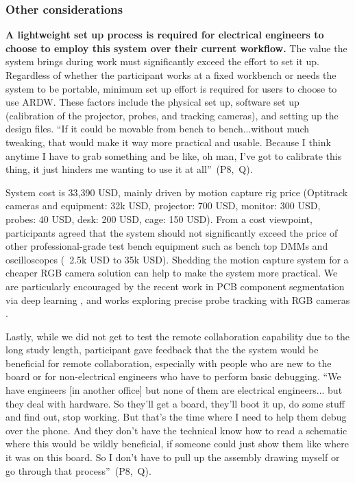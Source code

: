 \documentclass [11pt, proquest] {uwthesis}[2020/02/24]
\newcommand{\ARDWname}{ARDW}
\newcounter{sharc}
\newcommand{\sharcHere}[1]{Q\refstepcounter{sharc}\arabic{sharc}\label{#1}}
\begin{document}
\subsubsection{Other considerations}

\textbf{A lightweight set up process is required for electrical engineers to choose to employ this system over their current workflow.} The value the system brings during work must significantly exceed the effort to set it up. Regardless of whether the participant works at a fixed workbench or needs the system to be portable, minimum set up effort is required for users to choose to use \ARDWname. These factors include the physical set up, software set up (calibration of the projector, probes, and tracking cameras), and setting up the design files. ``If it could be movable from bench to bench...without much tweaking, that would make it way more practical and usable. Because I think anytime I have to grab something and be like, oh man, I've got to calibrate this thing, it just hinders me wanting to use it at all''~(P8,~\sharcHere{q:portable}).

{System cost is 33,390 USD, mainly driven by motion capture rig price (Optitrack cameras and equipment: 32k USD, projector: 700 USD, monitor: 300 USD, probes: 40 USD, desk: 200 USD, cage: 150 USD).}
From a cost viewpoint, participants agreed that the system should not significantly exceed the price of other professional-grade test bench equipment such as bench top DMMs and oscilloscopes (~2.5k USD to 35k USD).
Shedding the motion capture system for a cheaper RGB camera solution can help to make the system more practical. We are particularly encouraged by the recent work in PCB component segmentation via deep learning \cite{Pasunuri2022ASegmentation}, and works exploring precise probe tracking with RGB cameras \cite{WuDodecaPen:Stylus}.

Lastly, while we did not get to test the remote collaboration capability due to the long study length, participant gave feedback that the the system would be beneficial for remote collaboration, especially with  people who are new to the board or for non-electrical engineers who have to perform basic debugging. ``We have engineers [in another office] but none of them are electrical engineers... but they deal with hardware. So they'll get a board, they'll boot it up, do some stuff and find out, stop working. But that's the time where I need to help them debug over the phone. And they don't have the technical know how to read a schematic where this would be wildly beneficial, if someone could just show them like where it was on this board. So I don't have to pull up the assembly drawing myself or go through that process''~(P8,~\sharcHere{q:collaboration}).
\end{document}
